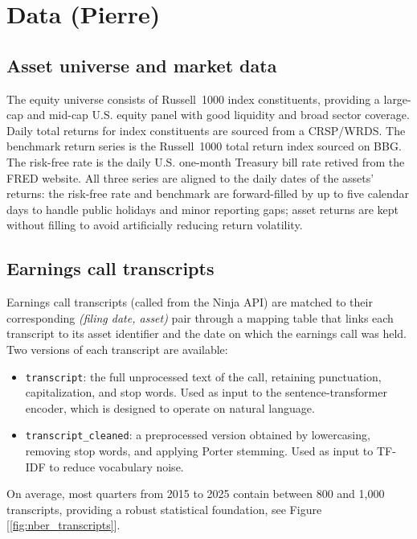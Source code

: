 \documentclass{article}
\begin{document}
\section{Data (Pierre)}

\subsection{Asset universe and market data}

The equity universe consists of Russell~1000 index constituents, providing a large-cap and mid-cap U.S. equity panel with good liquidity and broad sector coverage. Daily total returns for index constituents are sourced from a CRSP/WRDS. The benchmark return series is the Russell~1000 total return index sourced on BBG. The risk-free rate is the daily U.S. one-month Treasury bill rate retived from the FRED website. All three series are aligned to the daily dates of the assets' returns: the risk-free rate and benchmark are forward-filled by up to five calendar days to handle public holidays and minor reporting gaps; asset returns are kept without filling to avoid artificially reducing return volatility.

\subsection{Earnings call transcripts}

Earnings call transcripts (called from the Ninja API) are matched to their corresponding \textit{(filing date, asset)} pair through a mapping table that links each transcript to its asset identifier and the date on which the earnings call was held. Two versions of each transcript are available:
\begin{itemize}
  \item \texttt{transcript}: the full unprocessed text of the call, retaining punctuation, capitalization, and stop words. Used as input to the sentence-transformer encoder, which is designed to operate on natural language.
  \item \texttt{transcript\_cleaned}: a preprocessed version obtained by lowercasing, removing stop words, and applying Porter stemming. Used as input to TF-IDF to reduce vocabulary noise.
\end{itemize}
On average, most quarters from 2015 to 2025 contain between 800 and 1,000 transcripts, providing a robust statistical foundation, see Figure [\ref{fig:nber_transcripts}].
\end{document}
